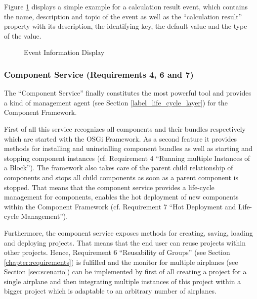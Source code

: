 Figure \ref{fig:event_information_display} displays a simple example for a calculation result
event, which contains the name, description and topic of the event as well as the ``calculation
result'' property with its description, the identifying key, the default value and the type of the
value.

\begin{figure}
	\centering
	\caption{Event Information Display}
	\label{fig:event_information_display}
\end{figure}

\subsubsection{Component Service (Requirements 4, 6 and 7)}
The ``Component Service'' finally constitutes the most powerful tool and provides a kind of management
agent (see Section \ref{label_life_cycle_layer}) for the Component Framework.

First of all this service recognizes all components and their bundles respectively which are started
with the OSGi Framework. As a second feature it provides methods for installing and uninstalling
component bundles as well as starting and stopping component instances (cf. Requirement 4 ``Running
multiple Instances of a Block''). The framework also takes care of the parent child relationship of
components and stops all child components as soon as a parent component is stopped. That means that
the component service provides a life-cycle management for components, enables the hot deployment
of new components within the Component Framework (cf. Requirement 7 ``Hot Deployment and Life-cycle
Management'').

Furthermore, the component service exposes methods for creating, saving, loading and deploying
projects. That means that the end user can reuse projects within other projects. Hence, Requirement
6 ``Reusability of Groups'' (see Section \ref{chapter:requirements}) is fulfilled and the monitor
for multiple airplanes (see Section \ref{sec:scenario}) can be implemented by first of all creating
a project for a single airplane and then integrating multiple instances of this project within a
bigger project which is adaptable to an arbitrary number of airplanes.

